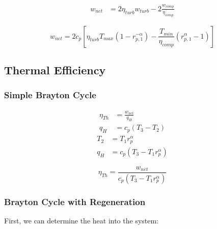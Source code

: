 \documentclass[
	12pt, %
]{brayton_cycle_report_style}
\begin{document}
\vspace{-2.5mm}

\begin{align*}
    w_{net} &= 2\eta_{turb}w_{turb}-2\frac{w_{comp}}{\eta_{comp}} 
\end{align*}


\begin{equation}
    w_{net} = 2c_p[\eta_{turb}T_{max}(1-r_{p,1}^{-\alpha})-\frac{T_{min}}{\eta_{comp}}(r_{p,1}^\alpha-1)] 
\end{equation}

\subsection{Thermal Efficiency}

\subsubsection{Simple Brayton Cycle} 

\vspace{-5mm}

\begin{multicols}{2}
  \begin{align*}
   \eta_{Th} &= \frac{w_{net}}{q_H}\\
   q_H &= c_p(T_3-T_2)
  \end{align*}
  \vspace{1mm}
  \begin{align*}
    T_2 &= T_1r_p^\alpha\\
    q_H &= c_p(T_3-T_1r_p^\alpha)
  \end{align*}
\end{multicols}

\vspace{-5mm}

\begin{equation}
    \eta_{Th}=\frac{w_{net}}{c_p(T_3-T_1r_p^\alpha)}
\end{equation}

\subsubsection{Brayton Cycle with Regeneration} 

First, we can determine the heat into the system:

\vspace{-5mm}
\end{document}
